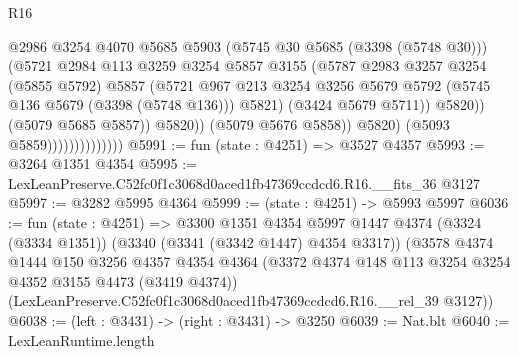 \begin{lexlean}{R16}
\begin{coremodule}
                                          @2986
                                          @3254
                                          @4070
                                          @5685
                                          @5903
                                          (@5745 @30 @5685 (@3398 (@5748 @30)))
                                          (@5721
                                            @2984
                                            @113
                                            @3259
                                            @3254
                                            @5857
                                            @3155
                                            (@5787
                                              @2983
                                              @3257
                                              @3254
                                              (@5855 @5792)
                                              @5857
                                              (@5721
                                                @967
                                                @213
                                                @3254
                                                @3256
                                                @5679
                                                @5792
                                                (@5745 @136 @5679 (@3398 (@5748 @136)))
                                                @5821)
                                              (@3424 @5679 @5711))
                                            @5820))
                                        (@5079 @5685 @5857))
                                      @5820))
                                  (@5079 @5676 @5858))
                                @5820)
                              (@5093 @5859))))))))))))))
@5991 := fun (state : @4251) => @3527 @4357
@5993 := @3264 @1351 @4354
@5995 := LexLeanPreserve.C52fc0f1c3068d0aced1fb47369ccdcd6.R16.__fits_36 @3127
@5997 := @3282 @5995 @4364
@5999 := (state : @4251) -> @5993 @5997
@6036 := fun (state : @4251) =>
  @3300
    @1351
    @4354
    @5997
    @1447
    @4374
    (@3324 (@3334 @1351))
    (@3340 (@3341 (@3342 @1447) @4354 @3317))
    (@3578
      @4374
      @1444
      @150
      @3256
      @4357
      @4354
      @4364
      (@3372 @4374 @148 @113 @3254 @3254 @4352 @3155 @4473 (@3419 @4374))
      (LexLeanPreserve.C52fc0f1c3068d0aced1fb47369ccdcd6.R16.__rel_39 @3127))
@6038 := (left : @3431) -> (right : @3431) -> @3250
@6039 := Nat.blt
@6040 := LexLeanRuntime.length

\end{coremodule}
\end{lexlean}
